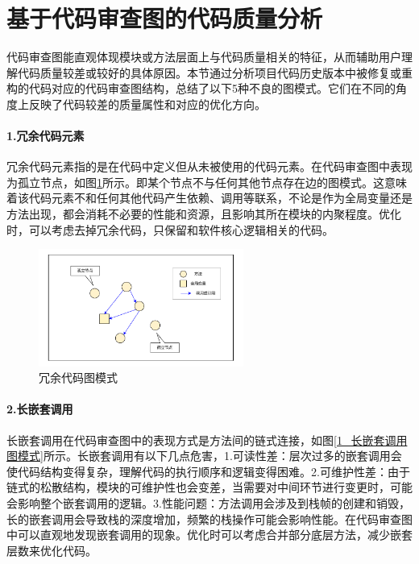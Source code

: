 \section{基于代码审查图的代码质量分析}


代码审查图能直观体现模块或方法层面上与代码质量相关的特征，从而辅助用户理解代码质量较差或较好的具体原因。本节通过分析项目代码历史版本中被修复或重构的代码对应的代码审查图结构，总结了以下5种不良的图模式。它们在不同的角度上反映了代码较差的质量属性和对应的优化方向。

\paragraph{1.冗余代码元素} 冗余代码元素指的是在代码中定义但从未被使用的代码元素。在代码审查图中表现为孤立节点，如图\ref{1_冗余代码图模式}所示。即某个节点不与任何其他节点存在边的图模式。这意味着该代码元素不和任何其他代码产生依赖、调用等联系，不论是作为全局变量还是方法出现，都会消耗不必要的性能和资源，且影响其所在模块的内聚程度。优化时，可以考虑去掉冗余代码，只保留和软件核心逻辑相关的代码。

\begin{figure}[h]
\centering
\includegraphics[width = 0.6\textwidth]{figures/孤立节点图模式_2.pdf}
\caption{冗余代码图模式}
\label{1_冗余代码图模式}
\end{figure}



\paragraph{2.长嵌套调用} 长嵌套调用在代码审查图中的表现方式是方法间的链式连接，如图\ref{1_长嵌套调用图模式}所示。长嵌套调用有以下几点危害，1.可读性差：层次过多的嵌套调用会使代码结构变得复杂，理解代码的执行顺序和逻辑变得困难。2.可维护性差：由于链式的松散结构，模块的可维护性也会变差，当需要对中间环节进行变更时，可能会影响整个嵌套调用的逻辑。3.性能问题：方法调用会涉及到栈帧的创建和销毁，长的嵌套调用会导致栈的深度增加，频繁的栈操作可能会影响性能。在代码审查图中可以直观地发现嵌套调用的现象。优化时可以考虑合并部分底层方法，减少嵌套层数来优化代码。

